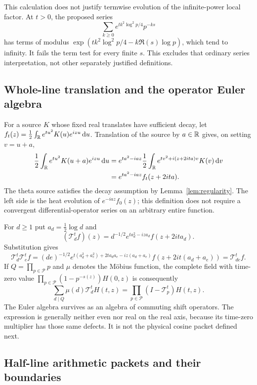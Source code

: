 This calculation does not justify termwise evolution of the infinite-power
local factor. At $t>0$, the proposed series
\[
 \sum_{k\ge0}e^{tk^2\log^2p/4}p^{-ks}
\]
has terms of modulus
$\exp(tk^2\log^2p/4-k\Re(s)\log p)$, which tend to infinity. It fails
the term test for every finite $s$. This excludes that ordinary series
interpretation, not other separately justified definitions.

\subsection{Whole-line translation and the operator Euler algebra}

For a source $K$ whose fixed real translates have sufficient decay, let
$f_t(z)=\frac12\int_\mathbb R e^{tu^2}K(u)e^{izu}\,\mathrm d u$. Translation of the
source by $a\in\mathbb R$ gives, on setting $v=u+a$,
\begin{align}
 \frac12\int_\mathbb R e^{tu^2}K(u+a)e^{izu}\,\mathrm d u
 &=e^{ta^2-iaz}\frac12\int_\mathbb R e^{tv^2+i(z+2ita)v}K(v)\,\mathrm d v\notag\\
 &=e^{ta^2-iaz}f_t(z+2ita).\label{eq:whole-translation}
\end{align}
The theta source satisfies the decay assumption by Lemma~\ref{lem:regularity}.
The left side is the heat evolution of $e^{-iaz}f_0(z)$; this definition
does not require a convergent differential-operator series on an arbitrary
entire function.

For $d\ge1$ put $a_d=\frac12\log d$ and
\begin{equation}\label{eq:T}
 (\mathcal T_d^tf)(z)=d^{-1/2}e^{ta_d^2-iza_d}f(z+2ita_d).
\end{equation}
Substitution gives
\[
 \mathcal T_d^t\mathcal T_e^tf
 =(de)^{-1/2}e^{t(a_d^2+a_e^2)+2ta_da_e-iz(a_d+a_e)}
    f(z+2it(a_d+a_e))
 =\mathcal T_{de}^tf.
\]
If $Q=\prod_{p\in\mathcal P}p$ and $\mu$ denotes the M\"obius function,
the complete field with time-zero value
$\prod_{p\in\mathcal P}(1-p^{-s(z)})H(0,z)$ is consequently
\begin{equation}\label{eq:operator-euler}
 \sum_{d\mid Q}\mu(d)\mathcal T_d^tH(t,z)
 =\prod_{p\in\mathcal P}(I-\mathcal T_p^t)H(t,z).
\end{equation}
The Euler algebra survives as an algebra of commuting shift operators.
The expression is generally neither even nor real on the real axis,
because its time-zero multiplier has those same defects. It is not the
physical cosine packet defined next.

\subsection{Half-line arithmetic packets and their boundaries}

